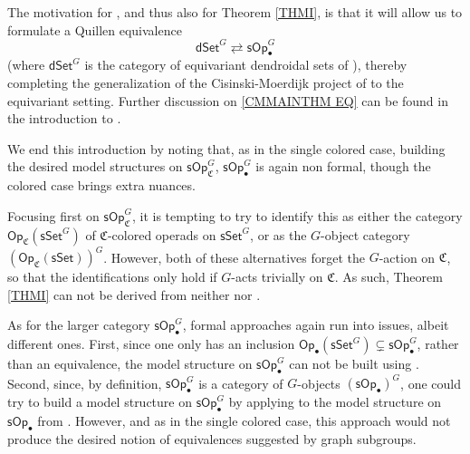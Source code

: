 \documentclass[a4paper,10pt
,draft
]{article}%
\numberwithin{equation}{section}
\numberwithin{figure}{section}
\theoremstyle{definition} %
\newcommand{\1}{\ensuremath{\mathbbm 1}}%
\begin{document}
The motivation for 
\cite[Thm. \ref{AC-THMA}]{BP_ACOP},
and thus also for Theorem \ref{THMI},
is that it will allow us to formulate 
a Quillen equivalence \cite{BP_TAS}
\begin{equation}\label{CMMAINTHM EQ}
\mathsf{dSet}^G \rightleftarrows \mathsf{sOp}_{\bullet}^G
\end{equation}
(where $\mathsf{dSet}^G$
is the category of equivariant dendroidal sets
of \cite{Per18}), thereby completing the 
generalization of the Cisinski-Moerdijk project of \cite{CM11,CM13a,CM13b} to the equivariant setting.
Further discussion on \eqref{CMMAINTHM EQ} can be found in the introduction to \cite{BP_TAS}.



We end this introduction by noting that, 
as in the single colored case,
building the desired model structures on 
$\mathsf{sOp}^G_{\mathfrak C}$, $\mathsf{sOp}^G_{\bullet}$
is again non formal, 
though the colored case brings extra nuances.

Focusing first on
$\mathsf{sOp}^G_{\mathfrak C}$,
it is tempting to try to identify this as
either the category
$\mathsf{Op}_{\mathfrak C}(\mathsf{sSet}^G)$
of $\mathfrak{C}$-colored operads on $\mathsf{sSet}^G$,
or as the $G$-object category
$\left(\mathsf{Op}_{\mathfrak C}(\mathsf{sSet})\right)^G$.
However, both of these alternatives forget the 
$G$-action on $\mathfrak C$,
so that the identifications only hold if 
$G$-acts trivially on $\mathfrak{C}$.
As such, Theorem \ref{THMI}
can not be derived from neither 
\cite[Thm. 3.2]{BM03} nor \cite[Prop. 2.6]{Ste16}.

As for the larger category
$\mathsf{sOp}^G_{\bullet}$,
formal approaches again run into issues, albeit different ones.
First, since one only has an inclusion
$\mathsf{Op}_{\bullet}(\mathsf{sSet}^G)
\subsetneq \mathsf{sOp}_{\bullet}^G$,
rather than an equivalence,
the model structure on $\mathsf{sOp}_{\bullet}^G$
can not be built using \cite{Cav}.
Second, since, by definition,
$\mathsf{sOp}^G_{\bullet}$
is a category of $G$-objects
$\left(\mathsf{sOp}_{\bullet}\right)^G$,
one could try to build a model structure
on $\mathsf{sOp}^G_{\bullet}$
by applying \cite[Prop. 2.6]{Ste16}
to the model structure on $\mathsf{sOp}_\bullet$ from \cite{Cav}.
However, and as in the single colored case,
this approach would not produce
the desired notion of equivalences suggested by graph subgroups.
\end{document}
